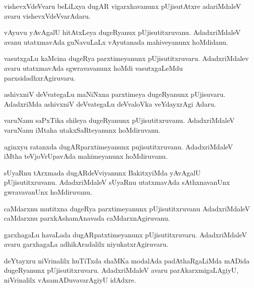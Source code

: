 \documentclass{article}
\begin{document}
\begin{mng}%
vishevxVdeVvaru beLiLxya dugAR vigarxhavanunx pUjisutAtxre adariMdaleV avaru vishevxVdeVvarAdaru.
\end{mng}

\begin{mng}%
vAyuvu yAvAgalU hitAtxLeya dugeRyanux pUjisutitxruvanu. AdadxriMdaleV avanu utatxmavAda guNavuLaLx 
vAyutanada mahiveyanunx hoMdidanu.
\end{mng}

\begin{mng}%
vasutxgaLu kaMcina dugeRya parxtimeyanunx pUjisutitxruvaru. AdadxriMdalev avaru utatxmavAda 
sgwravavanunx hoMdi vasutxgaLeMdu parxsidadhxrAgiruvaru.
\end{mng}

\begin{mng}%
ashivxniV deVvategaLu maNiNxna parxtimeya dugeRyanunx pUjisuvaru. AdadxriMda ashivxniV deVvategaLu 
deVvaloVka veYdayxrAgi Adaru.
\end{mng}

\begin{mng}%
varuNanu saPxTika shileya dugeRyanunx pUjisutitxruvanu. AdadxriMdaleV varuNanu iMtaha 
utakxSaRteyanunx hoMdiruvanu.
\end{mng}

\begin{mng}%
aginxyu ratanxda dugARparxtimeyanunx pujisutitxruvanu. AdadxriMdaleV iMtha teVjoVrUpavAda 
mahimeyanunx hoMdiruvanu.
\end{mng}

\begin{mng}%
sUyaRnu tArxmada dugARdeVviyanunx BakitxyiMda yAvAgalU pUjisutitxruvanu. AdadxriMdaleV sUyaRnu 
utatxmavAda sAthxnavanUnx gwravavanUnx hoMdiruvanu.
\end{mng}

\begin{mng}%
caMdarxnu mutitxna dugeRya parxtimeyanunx pUjisutitxruvanu AdadxriMdaleV caMdarxnu 
parxkAshamAnavada caMdarxnAgiruvanu.
\end{mng}

\begin{mng}%
garxhagaLu havaLada dugARpatxtimeyanunx pUjisutitxruvaru. AdadxriMdaleV avaru garxhagaLa 
adhikAradalilx niyukatxrAgiruvaru.
\end{mng}

\begin{mng}%
deYtayxru niVrinalilx huTiTxda shaMKa modalAda padAthaRgaLiMda mADida dugeRyanunx 
pUjisutitxruvaru. AdadxriMdaleV avaru parAkarxmigaLAgiyU, niVrinalilx vAsamADuvavarAgiyU idAdxre.
\end{mng}
\end{document}
